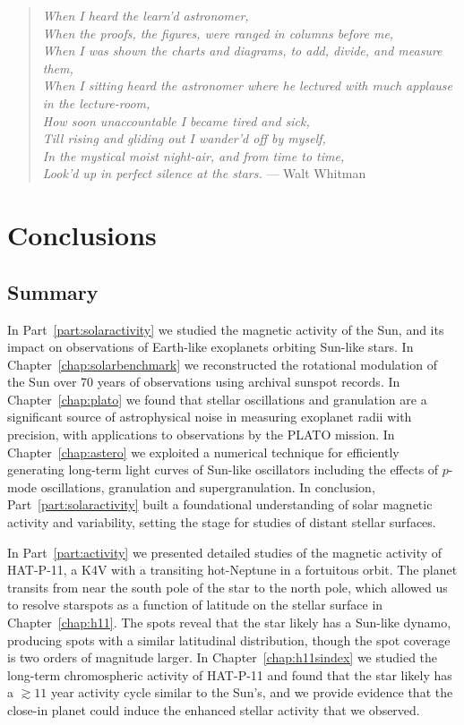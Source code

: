
\begin{verse}
{\it When I heard the learn'd astronomer,\\
When the proofs, the figures, were ranged in columns before me,\\
When I was shown the charts and diagrams, to add, divide, and measure them,\\
When I sitting heard the astronomer where he lectured with much applause in the lecture-room,\\
How soon unaccountable I became tired and sick,\\
Till rising and gliding out I wander'd off by myself,\\
In the mystical moist night-air, and from time to time,\\
Look'd up in perfect silence at the stars.\it}
\hfill --- Walt Whitman
\end{verse}

\chapter{Conclusions}

\section{Summary}

In Part~\ref{part:solaractivity} we studied the magnetic activity of the Sun, and its impact on observations of Earth-like exoplanets orbiting Sun-like stars. In Chapter~\ref{chap:solarbenchmark} we reconstructed the rotational modulation of the Sun over 70 years of observations using archival sunspot records. In Chapter~\ref{chap:plato} we found that stellar oscillations and granulation are a significant source of astrophysical noise in measuring exoplanet radii with precision, with applications to observations by the PLATO mission. In Chapter~\ref{chap:astero} we exploited a numerical technique for efficiently generating long-term light curves of Sun-like oscillators including the effects of $p$-mode oscillations, granulation and supergranulation. In conclusion, Part~\ref{part:solaractivity} built a foundational understanding of solar magnetic activity and variability, setting the stage for studies of distant stellar surfaces.

In Part~\ref{part:activity} we presented detailed studies of the magnetic activity of HAT-P-11, a K4V with a transiting hot-Neptune in a fortuitous orbit. The planet transits from near the south pole of the star to the north pole, which allowed us to resolve starspots as a function of latitude on the stellar surface in Chapter~\ref{chap:h11}. The spots reveal that the star likely has a Sun-like dynamo, producing spots with a similar latitudinal distribution, though the spot coverage is two orders of magnitude larger. In Chapter~\ref{chap:h11sindex} we studied the long-term chromospheric activity of HAT-P-11 and found that the star likely has a $\gtrsim11$ year activity cycle similar to the Sun's, and we provide evidence that the close-in planet could induce the enhanced stellar activity that we observed. 

